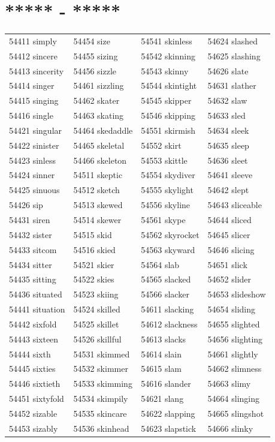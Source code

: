 \documentclass[10pt, oneside]{book}
\begin{document}
\begin{table}[h]
	\centering
	\section*{***** - *****}
	\begin{tabular}{l l l l}
54411 simply &54454 size &54541 skinless &54624 slashed\\
54412 sincere &54455 sizing &54542 skinning &54625 slashing\\
54413 sincerity &54456 sizzle &54543 skinny &54626 slate\\
54414 singer &54461 sizzling &54544 skintight &54631 slather\\
54415 singing &54462 skater &54545 skipper &54632 slaw\\
54416 single &54463 skating &54546 skipping &54633 sled\\
54421 singular &54464 skedaddle &54551 skirmish &54634 sleek\\
54422 sinister &54465 skeletal &54552 skirt &54635 sleep\\
54423 sinless &54466 skeleton &54553 skittle &54636 sleet\\
54424 sinner &54511 skeptic &54554 skydiver &54641 sleeve\\
54425 sinuous &54512 sketch &54555 skylight &54642 slept\\
54426 sip &54513 skewed &54556 skyline &54643 sliceable\\
54431 siren &54514 skewer &54561 skype &54644 sliced\\
54432 sister &54515 skid &54562 skyrocket &54645 slicer\\
54433 sitcom &54516 skied &54563 skyward &54646 slicing\\
54434 sitter &54521 skier &54564 slab &54651 slick\\
54435 sitting &54522 skies &54565 slacked &54652 slider\\
54436 situated &54523 skiing &54566 slacker &54653 slideshow\\
54441 situation &54524 skilled &54611 slacking &54654 sliding\\
54442 sixfold &54525 skillet &54612 slackness &54655 slighted\\
54443 sixteen &54526 skillful &54613 slacks &54656 slighting\\
54444 sixth &54531 skimmed &54614 slain &54661 slightly\\
54445 sixties &54532 skimmer &54615 slam &54662 slimness\\
54446 sixtieth &54533 skimming &54616 slander &54663 slimy\\
54451 sixtyfold &54534 skimpily &54621 slang &54664 slinging\\
54452 sizable &54535 skincare &54622 slapping &54665 slingshot\\
54453 sizably &54536 skinhead &54623 slapstick &54666 slinky\\
	\end{tabular}
 \end{table}
\end{document}
